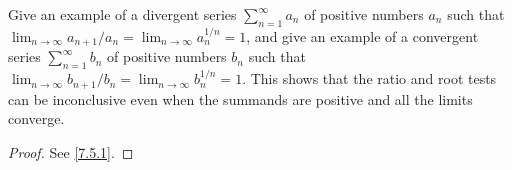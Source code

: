 \begin{ex}\label{ex:7.5.3}
  Give an example of a divergent series \(\sum_{n = 1}^\infty a_n\) of positive numbers \(a_n\) such that \(\lim_{n \to \infty} a_{n + 1} / a_n = \lim_{n \to \infty} a_n^{1 / n} = 1\), and give an example of a convergent series \(\sum_{n = 1}^\infty b_n\) of positive numbers \(b_n\) such that \(\lim_{n \to \infty} b_{n + 1} / b_n = \lim_{n \to \infty} b_n^{1 / n} = 1\).
  This shows that the ratio and root tests can be inconclusive even when the summands are positive and all the limits converge.
\end{ex}

\begin{proof}
  See \cref{7.5.1}.
\end{proof}